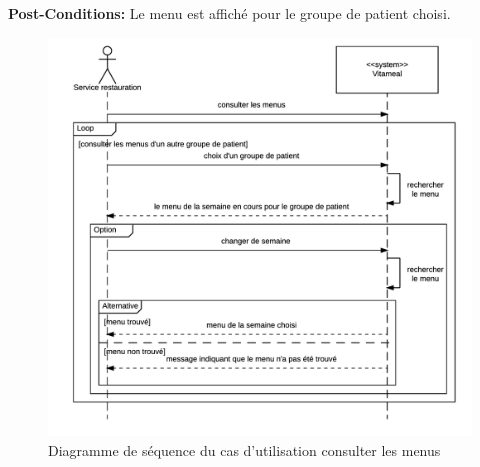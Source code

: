 \noindent \textbf{Post-Conditions:} Le menu est affiché pour le groupe de patient choisi.

\begin{figure}
\centering
\includegraphics[scale=0.75]{../../CasDUtilisations/ConsulterMenus/sequence_consulter_menus.png}
\caption{Diagramme de séquence du cas d'utilisation consulter les menus}
\label{ConsulterMenusSeq}
\end{figure}